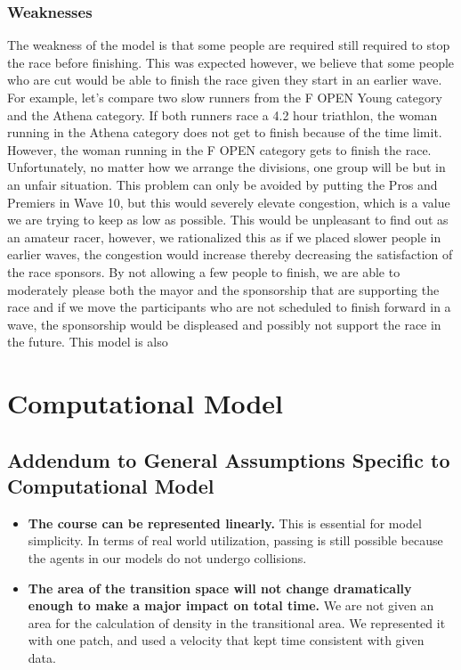 \documentclass[12pt]{article}
\begin{document}
\subsubsection*{Weaknesses}
The weakness of the model is that some people are required still required to stop the race before finishing. This was expected however, we believe that some people who are cut would be able to finish the race given they start in an earlier wave. For example, let’s compare two slow runners from the F OPEN Young category and the Athena category. If both runners race a 4.2 hour triathlon, the woman running in the Athena category does not get to finish because of the time limit. However, the woman running in the F OPEN category gets to finish the race. Unfortunately, no matter how we arrange the divisions, one group will be but in an unfair situation. This problem can only be avoided by putting the Pros and Premiers in Wave 10, but this would severely elevate congestion, which is a value we are trying to keep as low as possible. This would be unpleasant to find out as an amateur racer, however, we rationalized this as if we placed slower people in earlier waves, the congestion would increase thereby decreasing the satisfaction of the race sponsors. By not allowing a few people to finish, we are able to moderately please both the mayor and the sponsorship that are supporting the race and if we move the participants who are not scheduled to finish forward in a wave, the sponsorship would be displeased and possibly not support the race in the future. This model is also 

\section{Computational Model}

\subsection{Addendum to General Assumptions Specific to Computational Model}
\begin{itemize}
  \item \textbf{The course can be represented linearly.} This is essential for model simplicity. In terms of real world utilization, passing is still possible because the agents in our models do not undergo collisions.
  \item \textbf{The area of the transition space will not change dramatically enough to make a major impact on total time.} We are not given an area for the calculation of density in the transitional area. We represented it with one patch, and used a velocity that kept time consistent with given data.
\end{itemize}
\end{document}
